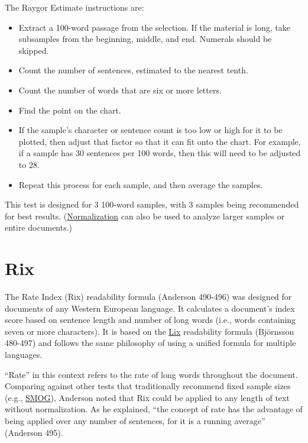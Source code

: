 \documentclass[
]{book}
\providecommand{\tightlist}{%
  \setlength{\itemsep}{0pt}\setlength{\parskip}{0pt}}
\theoremstyle{definition}
\theoremstyle{definition}
\theoremstyle{definition}
\theoremstyle{definition}
\theoremstyle{remark}
\begin{document}
\begin{minipage}{\textwidth}

The Raygor Estimate instructions are:

\begin{itemize}
\tightlist
\item
  Extract a 100-word passage from the selection. If the material is long, take subsamples from the beginning, middle, and end. Numerals should be skipped.
\item
  Count the number of sentences, estimated to the nearest tenth.
\item
  Count the number of words that are six or more letters.
\item
  Find the point on the chart.
\item
  If the sample's character or sentence count is too low or high for it to be plotted, then adjust that factor so that it can fit onto the chart. For example, if a sample has 30 sentences per 100 words, then this will need to be adjusted to 28.
\item
  Repeat this process for each sample, and then average the samples.
\end{itemize}

\end{minipage}

This test is designed for 3 100-word samples, with 3 samples being recommended for best results. (\protect\hyperlink{glossary}{Normalization} can also be used to analyze larger samples or entire documents.)


\newpage

\hypertarget{rix-test}{%
\section{\texorpdfstring{Rix}{Rix}}\label{rix-test}}

The Rate Index (Rix) readability formula (Anderson 490-496) was designed for documents of any Western European language. It calculates a document's index score based on sentence length and number of long words (i.e., words containing seven or more characters). It is based on the \protect\hyperlink{lix-test}{Lix} readability formula (Björnsson 480-497) and follows the same philosophy of using a unified formula for multiple languages.

``Rate'' in this context refers to the rate of long words throughout the document. Comparing against other tests that traditionally recommend fixed sample sizes (e.g., \protect\hyperlink{smog-test}{SMOG}), Anderson noted that Rix could be applied to any length of text without normalization. As he explained, ``the concept of rate has the advantage of being applied over any number of sentences, for it is a running average'' (Anderson 495).
\end{document}
